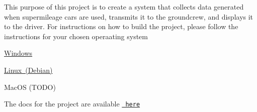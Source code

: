 This purpose of this project is to create a system that collects data generated when supermileage cars are used, transmits it to the groundcrew, and displays it to the driver. For instructions on how to build the project, please follow the instructions for your chosen operaating system
\begin{DoxyItemize}
\item \mbox{\hyperlink{md_Instructions_WindowsSetup}{Windows}}
\item \mbox{\hyperlink{md_Instructions_LinuxSetup}{Linux (Debian)}}
\item Mac\+OS (TODO)
\end{DoxyItemize}

The docs for the project are available \href{https://heev.github.io/SupermilageDisplay/}{\texttt{ here}} 